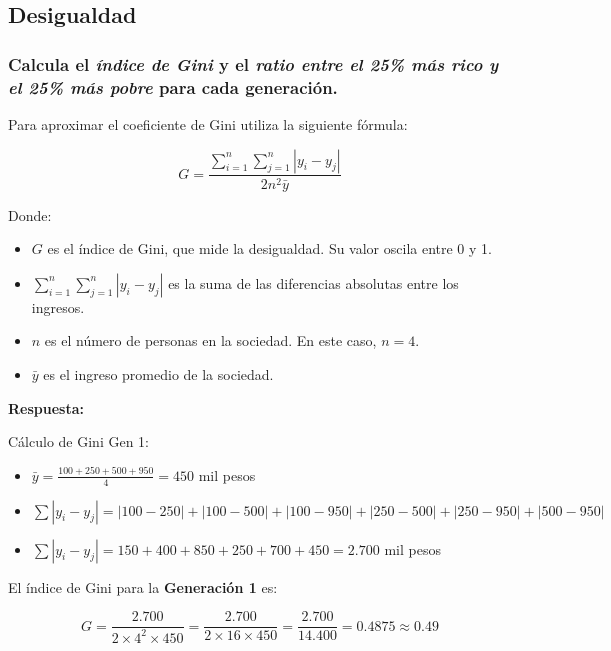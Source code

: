 \documentclass[
]{article}
\begin{document}
\subsection{Desigualdad}\label{desigualdad}

\subsubsection{\texorpdfstring{Calcula el \emph{índice de Gini} y el
\emph{ratio entre el 25\% más rico y el 25\% más pobre} para cada
generación.}{Calcula el índice de Gini y el ratio entre el 25\% más rico y el 25\% más pobre para cada generación.}}\label{calcula-el-uxedndice-de-gini-y-el-ratio-entre-el-25-muxe1s-rico-y-el-25-muxe1s-pobre-para-cada-generaciuxf3n.}

Para aproximar el coeficiente de Gini utiliza la siguiente fórmula:

\[G = \frac{\sum_{i=1}^{n} \sum_{j=1}^{n} |y_i - y_j|}{2n^2 \bar{y}}\]

Donde:

\begin{itemize}
\item
  \(G\) es el índice de Gini, que mide la desigualdad. Su valor oscila
  entre 0 y 1.
\item
  \(\sum_{i=1}^{n} \sum_{j=1}^{n} |y_i - y_j|\) es la suma de las
  diferencias absolutas entre los ingresos.
\item
  \(n\) es el número de personas en la sociedad. En este caso,
  \(n = 4\).
\item
  \(\bar{y}\) es el ingreso promedio de la sociedad.
\end{itemize}

\textbf{Respuesta:}

Cálculo de Gini Gen 1:

\begin{itemize}
\item
  \(\bar{y} = \frac{100 + 250 + 500 + 950}{4} = 450\) mil pesos
\item
  \(\sum |y_i - y_j| = |100 - 250| + |100 - 500| + |100 - 950| + |250 - 500| + |250 - 950| + |500 - 950|\)
\item
  \(\sum |y_i - y_j| = 150 + 400 + 850 + 250 + 700 + 450 = 2.700\) mil
  pesos
\end{itemize}

El índice de Gini para la \textbf{Generación 1} es:

\[G = \frac{2.700}{2 \times 4^2 \times 450} = \frac{2.700}{2 \times 16 \times 450} = \frac{2.700}{14.400} = 0.4875 \approx 0.49\]
\end{document}
